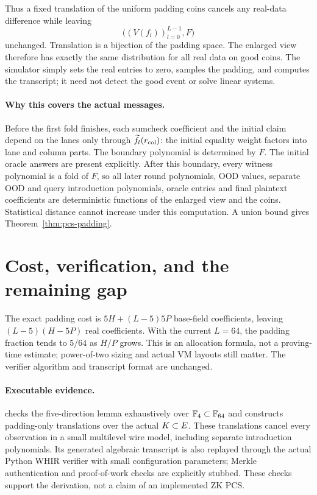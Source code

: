 \documentclass[11pt]{article}
\begin{document}
Thus a fixed translation of the uniform padding coins cancels any real-data difference while leaving
\[
 \bigl((V(f_l))_{l=0}^{L-1},F\bigr)
\]
unchanged. Translation is a bijection of the padding space. The enlarged view therefore has exactly the same distribution for all real data on good coins. The simulator simply sets the real entries to zero, samples the padding, and computes the transcript; it need not detect the good event or solve linear systems.

\paragraph{Why this covers the actual messages.} Before the first fold finishes, each sumcheck coefficient and the initial claim depend on the lanes only through $\widetilde{f}_l(r_{\mathrm{col}})$: the initial equality weight factors into lane and column parts. The boundary polynomial is determined by $F$. The initial oracle answers are present explicitly. After this boundary, every witness polynomial is a fold of $F$, so all later round polynomials, OOD values, separate OOD and query introduction polynomials, oracle entries and final plaintext coefficients are deterministic functions of the enlarged view and the coins. Statistical distance cannot increase under this computation. A union bound gives Theorem~\ref{thm:pcs-padding}.

\section{Cost, verification, and the remaining gap}

The exact padding cost is $5H+(L-5)5P$ base-field coefficients, leaving $(L-5)(H-5P)$ real coefficients. With the current $L=64$, the padding fraction tends to $5/64$ as $H/P$ grows. This is an allocation formula, not a proving-time estimate; power-of-two sizing and actual VM layouts still matter. The verifier algorithm and transcript format are unchanged.

\paragraph{Executable evidence.}  checks the five-direction lemma exhaustively over $\mathbb{F}_4\subset\mathbb{F}_{64}$ and constructs padding-only translations over the actual $K\subset E$. These translations cancel every observation in a small multilevel wire model, including separate introduction polynomials. Its generated algebraic transcript is also replayed through the actual Python WHIR verifier with small configuration parameters; Merkle authentication and proof-of-work checks are explicitly stubbed. These checks support the derivation, not a claim of an implemented ZK PCS.
\end{document}

